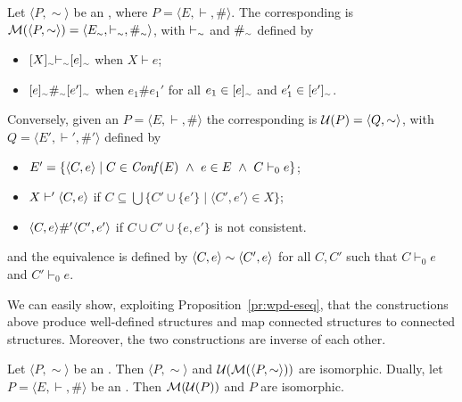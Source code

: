 \begin{definition}
  Let $\langle P, \sim \rangle$ be an {\eseqabbr}, where
  $P = \langle E, \vdash, \# \rangle$. The corresponding {\esabbr} is
  $\fuse{\langle P, \sim\rangle} = \langle \quotient{E}{\sim},
  \quotient{\vdash}{\sim}, \quotient{\#}{\sim} \rangle$, with
  $\quotient{\vdash}{\sim}$ and $\quotient{\#}{\sim}$ defined by
  \begin{itemize}
  \item $\eqclass[\sim]{X} \quotient{\vdash}{\sim} \eqclass[\sim]{e}$ when $X \vdash e$;
  \item $\eqclass[\sim]{e} \quotient{\#}{\sim} \eqclass[\sim]{e'}$ 
           when $e_1 \# e_1'$ for all $e_1 \in \eqclass[\sim]{e}$ and $e_1' \in \eqclass[\sim]{e'}$.
  \end{itemize}
  Conversely, given an {\esabbr} $P = \langle E, \vdash, \# \rangle$ the
  corresponding {\eseqabbr} is $\unf{P} = \langle Q, \sim \rangle$, with
  $Q = \langle E', \vdash', \#' \rangle$ defined by
  \begin{itemize}
  \item
    $E' = \{ \esir{C}{e} \mid C \in \conf{E}\ \land\ e\in E\ \land\ C
    \vdash_0 e \}$;
  \item $X \vdash' \esir{C}{e}$ if
    $C \subseteq \bigcup \{ C' \cup \{e'\} \mid \langle C', e' \rangle
    \in X\} $;
  \item $\esir{C}{e} \#' \esir{C'}{e'}$ if
    $C \cup C' \cup \{e, e'\}$ is not consistent.
  \end{itemize}
  and the equivalence is defined by $\esir{C}{e} \sim \esir{C'}{e}$ for all $C, C'$ such that $C \vdash_0 e$ and $C' \vdash_0 e$.
\end{definition}

We can easily show, exploiting Proposition~\ref{pr:wpd-eseq},
that the constructions above produce well-defined structures and map
connected structures to connected structures.
%
Moreover, the two constructions are inverse of each other.

\begin{proposition}
  \label{pr:epes-inverse}
  Let $\langle P, \sim \rangle$ be an {\eseqabbr}.
  Then $\langle P, \sim \rangle$ and
  $\unf{\fuse{\langle P, \sim\rangle}}$ are isomorphic. Dually, 
  let $P = \langle E, \vdash, \# \rangle$ be an
  {\esabbr}. Then
  $\fuse{\unf{P}}$ and $P$ are isomorphic.
\end{proposition}


